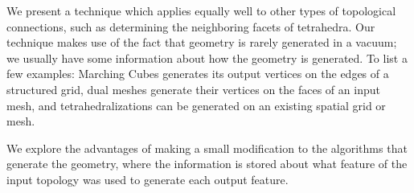 \documentclass[10pt,journal,cspaper,compsoc]{IEEEtran}
\begin{document}
We present a technique which applies equally well to other types of topological 
connections, such as determining the neighboring facets of tetrahedra. Our technique makes use of the fact that geometry is rarely generated in a vacuum; we usually have some information about how the geometry is generated. To list a few examples: Marching Cubes generates its output vertices on the edges of a structured grid, dual meshes generate their vertices on the faces of an input mesh, and tetrahedralizations can be generated on an existing spatial grid or mesh. 

We explore the advantages of making a small modification to the algorithms that generate the geometry, where the information is stored about what feature of the input topology was used to generate each output feature. 

\begin{figure}[!tb]

\end{figure}
\end{document}
